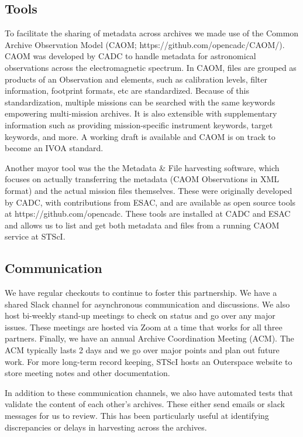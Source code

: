 \documentclass[11pt,twoside]{article}
\begin{document}
\subsection{Tools}

To facilitate the sharing of metadata across archives we made use of the Common Archive Observation Model (CAOM; https://github.com/opencadc/CAOM/). 
CAOM was developed by CADC to handle metadata for astronomical observations across the electromagnetic spectrum. 
In CAOM, files are grouped as products of an Observation and elements, such as calibration levels, filter information, footprint formats, etc are standardized. 
Because of this standardization, multiple missions can be searched with the same keywords empowering multi-mission archives. 
It is also extensible with supplementary information such as providing mission-specific instrument keywords, target keywords, and more. 
A working draft is available and CAOM is on track to become an IVOA standard. 

Another mayor tool was the the Metadata \& File harvesting software, which focuses on 
actually transferring the metadata (CAOM Observations in XML format) and the actual mission files themselves. 
These were originally developed by CADC, with contributions from ESAC, 
and are available as open source tools at https://github.com/opencadc.
These tools are installed at CADC and ESAC and allows us to list and get both metadata and files from a running CAOM service at STScI. 

\subsection{Communication}

We have regular checkouts to continue to foster this partnership. 
We have a shared Slack channel for asynchronous communication and discussions. 
We also host bi-weekly stand-up meetings to check on status and go over any major issues. 
These meetings are hosted via Zoom at a time that works for all three partners. 
Finally, we have an annual Archive Coordination Meeting (ACM). 
The ACM typically lasts 2 days and we go over major points and plan out future work. 
For more long-term record keeping, STScI hosts an Outerspace website to store meeting notes and other documentation.

In addition to these communication channels, we also have automated tests that validate the content of each other's archives. 
These either send emails or slack messages for us to review.
This has been particularly useful at identifying discrepancies or delays in harvesting across the archives. 
\end{document}

